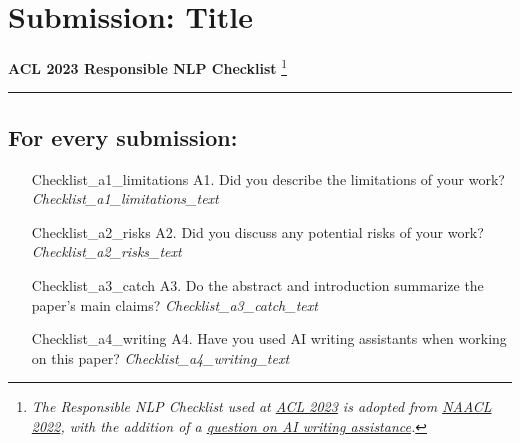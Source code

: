 \documentclass[11pt]{article}
\newcommand\blfootnote[1]{%
  \begingroup
  \renewcommand\thefootnote{}\footnote{#1}%
  \addtocounter{footnote}{-1}%
  \endgroup
}
\begin{document}
\appendix
\section*{Submission: {{Title}}}
\textbf{ACL 2023 Responsible NLP Checklist}
\blfootnote{\textit{The Responsible NLP Checklist used at \href{https://2023.aclweb.org/}{ACL 2023} is adopted from \href{https://2022.naacl.org/blog/responsible-nlp-research-checklist/}{NAACL 2022}, 
with the addition of a \href{https://2023.aclweb.org/blog/ACL-2023-policy/}{question on AI writing assistance}.}} 
\hrule

\renewcommand{\thesubsection}{\Alph{subsection}}

\subsection{For every submission:}
\begin{itemize}
    \item[{{Checklist_a1_limitations}}] A1. Did you describe the limitations of your work?
    \newline\textit{{{Checklist_a1_limitations_text}}}
    \item[{{Checklist_a2_risks}}] A2. Did you discuss any potential risks of your work?
    \newline\textit{{{Checklist_a2_risks_text}}}
    \item[{{Checklist_a3_catch}}] A3. Do the abstract and introduction summarize the paper's main claims?
    \newline\textit{{{Checklist_a3_catch_text}}}
    \item[{{Checklist_a4_writing}}] A4. Have you used AI writing assistants when working on this paper?
    \newline\textit{{{Checklist_a4_writing_text}}}
\end{itemize}

\end{document}

